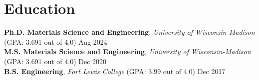 \section{Education}

\textbf{Ph.D. Materials Science and Engineering}, \textit{University of Wisconsin-Madison} (GPA: 3.691 out of 4.0) \hfill Aug 2024\\
\textbf{M.S. Materials Science and Engineering}, \textit{University of Wisconsin-Madison} (GPA: 3.691 out of 4.0)  \hfill Dec 2020\\
\textbf{B.S. Engineering}, \textit{Fort Lewis College} (GPA: 3.99 out of 4.0)                                      \hfill Dec 2017\\
